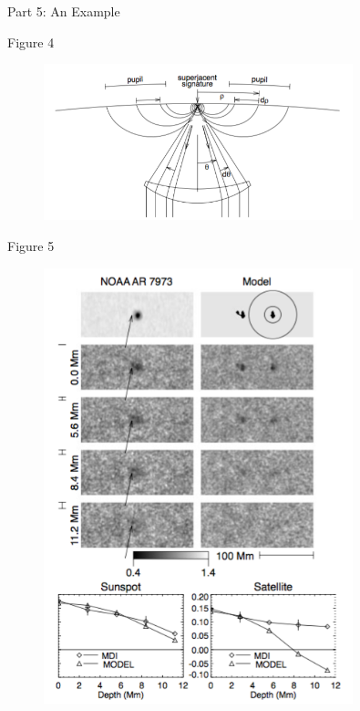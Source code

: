 \documentclass{beamer}
\begin{document}
\begin{frame}{4.1}
\end{frame}

\begin{frame}{4.2}
\end{frame}

\begin{frame}{4.3}
\end{frame}

\begin{frame}{Part 5: An Example}
\end{frame}

\begin{frame}{Figure 4}
    \begin{figure}
        \includegraphics[width=0.8\textwidth]{fig_4.png}
    \end{figure}
\end{frame}

\begin{frame}{Figure 5}
    \begin{figure}
        \includegraphics[width=0.8\textwidth]{fig_5.png}
    \end{figure}
\end{frame}
\end{document}

